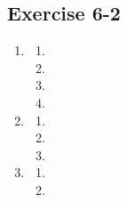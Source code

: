 \subsection{Exercise 6-2} %
    \begin{enumerate}[label=\textbf{\arabic*}.]
	\item %
	\begin{enumerate}[noitemsep, label=\textbf{(\alph*)} ]
	    \item %
	    \item %
	    \item %
	    \item %
	\end{enumerate}


	\item %
	\begin{enumerate}[noitemsep, label=\textbf{(\alph*)} ]
	    \item %
	    \item %
	    \item %
	\end{enumerate}

	\item %
	\begin{enumerate}[noitemsep, label=\textbf{(\alph*)} ]
	    \item %
	    \item %
	\end{enumerate}
    \end{enumerate}
